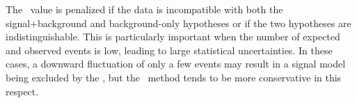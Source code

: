The \cls\ value is penalized if the data is incompatible with both the
signal+background and background-only hypotheses or if the two hypotheses are
indistinguishable.
This is particularly important when the number of expected and observed events
is low, leading to large statistical uncertainties.
In these cases, a downward fluctuation of only a few events may result in a
signal model being excluded by the \clsb, but the \cls\ method tends to be
more conservative in this respect.
